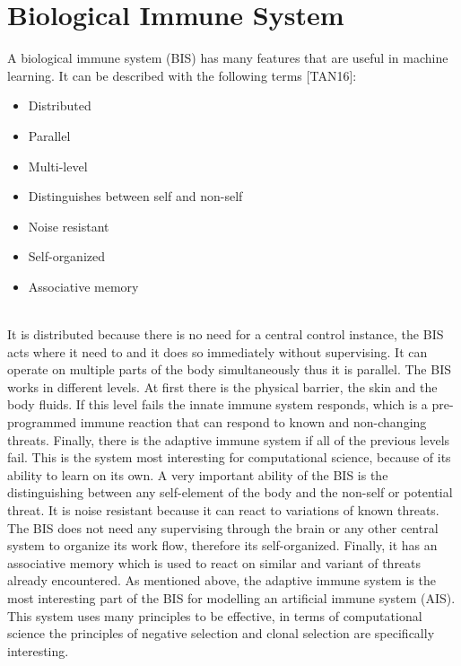 %
%
% 
% 
% 


\chapter{Biological Immune System}
\label{chap:bis}

A biological immune system (BIS) has many features that are useful in machine learning. It can be described with the following terms [TAN16]:
\begin{itemize}
	\item 	Distributed
	\item 	Parallel
	\item 	Multi-level
	\item 	Distinguishes between self and non-self
	\item 	Noise resistant
	\item 	Self-organized
	\item 	Associative memory
	
\end{itemize}\\

It is distributed because there is no need for a central control instance, the BIS acts where it need to and it does so immediately without supervising. It can operate on multiple parts of the body simultaneously thus it is parallel. The BIS works in different levels. At first there is the physical barrier, the skin and the body fluids. If this level fails the innate immune system responds, which is a pre-programmed immune reaction that can respond to known and non-changing threats. Finally, there is the adaptive immune system if all of the previous levels fail. This is the system most interesting for computational science, because of its ability to learn on its own. A very important ability of the BIS is the distinguishing between any self-element of the body and the non-self or potential threat. It is noise resistant because it can react to variations of known threats. The BIS does not need any supervising through the brain or any other central system to organize its work flow, therefore its self-organized. Finally, it has an associative memory which is used to react on similar and variant of threats already encountered.
As mentioned above, the adaptive immune system is the most interesting part of the BIS for modelling an artificial immune system (AIS). This system uses many principles to be effective, in terms of computational science the principles of negative selection and clonal selection are specifically interesting.

